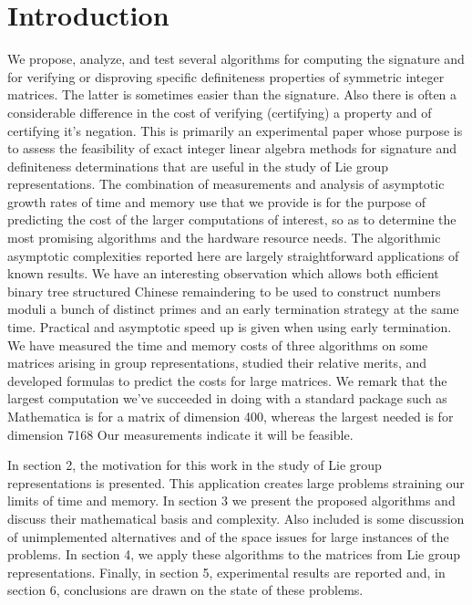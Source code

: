 \documentclass{acm_proc_article-sp}
\begin{document}


\section{Introduction}

We propose, analyze, and test several algorithms for 
computing the signature and for verifying or disproving specific
definiteness properties of symmetric integer matrices.  
The latter is sometimes easier than the signature.  
Also there is often a considerable difference in the 
cost of verifying (certifying) a property and of certifying it's negation.
This is primarily an experimental paper whose purpose is to assess the feasibility 
of exact integer linear algebra methods for signature and definiteness determinations
that are useful in the study of Lie group representations.
The combination of measurements and analysis of asymptotic growth rates of time
and memory use that we provide is for the purpose of predicting the cost of the larger
computations of interest, so as to determine the most promising algorithms and the 
hardware resource needs.
The algorithmic asymptotic complexities reported here are largely straightforward 
applications of known results. 
We have an interesting observation which
allows both efficient binary tree structured Chinese remaindering to be used to construct 
numbers moduli a bunch of distinct primes and an early termination strategy at the same time.
Practical and asymptotic speed up is given when using early termination.
We have measured the time and memory costs of three algorithms on some matrices arising
in group representations, 
studied their relative merits, and developed formulas to predict the costs for large matrices.
We remark that the largest computation we've succeeded in doing with
a standard package such as Mathematica is for a matrix of dimension
400, whereas the largest needed is for dimension 7168  Our measurements 
indicate it will be feasible.

In section 2, the motivation for this work in the study of Lie group
representations is presented.  This application creates large problems
straining our limits of time and memory.
In section 3 we present the proposed algorithms and discuss their mathematical
basis and complexity.
Also included is some discussion
of unimplemented alternatives and of the space issues for large instances
of the problems. In section 4, we apply these algorithms to the matrices from 
Lie group representations.
Finally, in section 5, experimental results are reported
and, in section 6, conclusions are drawn on the state of these problems.
\end{document}
